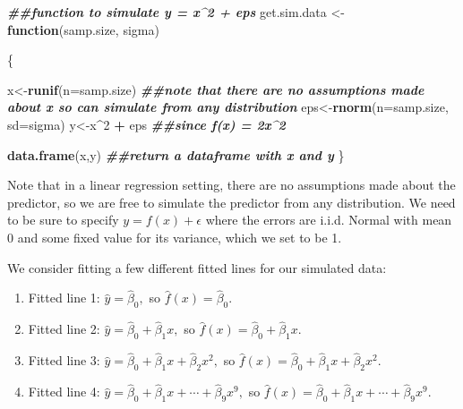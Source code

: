 \documentclass[
]{book}
\newenvironment{Shaded}{\begin{snugshade}}{\end{snugshade}}
\newcommand{\AttributeTok}[1]{\textcolor[rgb]{0.13,0.29,0.53}{#1}}
\newcommand{\ControlFlowTok}[1]{\textcolor[rgb]{0.13,0.29,0.53}{\textbf{#1}}}
\newcommand{\DecValTok}[1]{\textcolor[rgb]{0.00,0.00,0.81}{#1}}
\newcommand{\DocumentationTok}[1]{\textcolor[rgb]{0.56,0.35,0.01}{\textbf{\textit{#1}}}}
\newcommand{\FunctionTok}[1]{\textcolor[rgb]{0.13,0.29,0.53}{\textbf{#1}}}
\newcommand{\NormalTok}[1]{#1}
\newcommand{\OtherTok}[1]{\textcolor[rgb]{0.56,0.35,0.01}{#1}}
\newcommand{\SpecialCharTok}[1]{\textcolor[rgb]{0.81,0.36,0.00}{\textbf{#1}}}
\providecommand{\tightlist}{%
  \setlength{\itemsep}{0pt}\setlength{\parskip}{0pt}}
\begin{document}
\begin{Shaded}
\begin{Highlighting}[]
\DocumentationTok{\#\#function to simulate y = x\^{}2 + eps}
\NormalTok{get.sim.data }\OtherTok{\textless{}{-}} \ControlFlowTok{function}\NormalTok{(samp.size, sigma)}
  
\NormalTok{\{}
  
\NormalTok{  x}\OtherTok{\textless{}{-}}\FunctionTok{runif}\NormalTok{(}\AttributeTok{n=}\NormalTok{samp.size) }\DocumentationTok{\#\#note that there are no assumptions made about x so can simulate from any distribution}
\NormalTok{  eps}\OtherTok{\textless{}{-}}\FunctionTok{rnorm}\NormalTok{(}\AttributeTok{n=}\NormalTok{samp.size, }\AttributeTok{sd=}\NormalTok{sigma)}
\NormalTok{  y}\OtherTok{\textless{}{-}}\NormalTok{x}\SpecialCharTok{\^{}}\DecValTok{2} \SpecialCharTok{+}\NormalTok{ eps }\DocumentationTok{\#\#since f(x) = 2x\^{}2}
  
  \FunctionTok{data.frame}\NormalTok{(x,y) }\DocumentationTok{\#\#return a dataframe with x and y}
\NormalTok{\}}
\end{Highlighting}
\end{Shaded}

Note that in a linear regression setting, there are no assumptions made about the predictor, so we are free to simulate the predictor from any distribution. We need to be sure to specify \(y = f(x) + \epsilon\) where the errors are i.i.d. Normal with mean 0 and some fixed value for its variance, which we set to be 1.

We consider fitting a few different fitted lines for our simulated data:

\begin{enumerate}
\def\labelenumi{\arabic{enumi}.}
\tightlist
\item
  Fitted line 1: \(\hat{y} = \hat{\beta}_0,\) so \(\hat{f}(x) = \hat{\beta}_0\).
\item
  Fitted line 2: \(\hat{y} = \hat{\beta}_0 + \hat{\beta}_1 x,\) so \(\hat{f}(x) = \hat{\beta}_0 + \hat{\beta}_1 x\).
\item
  Fitted line 3: \(\hat{y} = \hat{\beta}_0 + \hat{\beta}_1 x + \hat{\beta}_2 x^2,\) so \(\hat{f}(x) = \hat{\beta}_0 + \hat{\beta}_1 x + \hat{\beta}_2 x^2\).
\item
  Fitted line 4: \(\hat{y} = \hat{\beta}_0 + \hat{\beta}_1 x + \cdots + \hat{\beta}_9 x^9,\) so \(\hat{f}(x) = \hat{\beta}_0 + \hat{\beta}_1 x + \cdots + \hat{\beta}_9 x^9\).
\end{enumerate}
\end{document}
